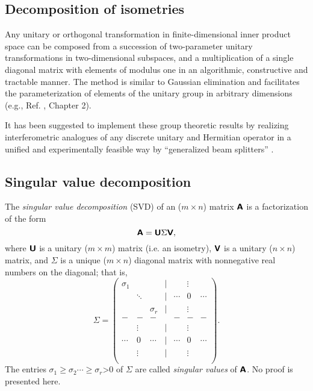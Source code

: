 \subsection{Decomposition of isometries}

Any unitary or orthogonal transformation   in finite-dimensional inner product space
can be composed from a succession of two-parameter unitary transformations in
two-dimensional subspaces,
and a multiplication of a single diagonal matrix with elements of modulus one
in an algorithmic, constructive and tractable manner.
The method is similar to Gaussian elimination and facilitates the parameterization of elements
of the unitary group  in arbitrary dimensions (e.g., Ref. \cite{murnaghan}, Chapter 2).

{\color{Purple}
It has been suggested to implement
these group theoretic results by realizing interferometric analogues
of any discrete unitary and Hermitian operator
in a unified and experimentally feasible way by ``generalized beam splitters''   \cite{rzbb,reck-94}.}


\subsection{Singular value decomposition}

The {\em singular value decomposition}
(SVD)
of an ($m\times n$)  matrix $\textsf{\textbf{A}}$ is a factorization of the form
\begin{equation}
\textsf{\textbf{A}} = \textsf{\textbf{U}} \Sigma \textsf{\textbf{V}} ,
\end{equation}
where
$\textsf{\textbf{U}}$ is a unitary ($m\times m$)  matrix (i.e. an isometry),
$\textsf{\textbf{V}}$ is a unitary ($n\times n$)  matrix,
and
$\Sigma$ is a unique ($m\times n$)   diagonal matrix with nonnegative real numbers on the diagonal;
that is,
\begin{equation}
\Sigma =
\begin{pmatrix}
\sigma_1&&&{|}&&\vdots& \\
  &\ddots &&{|}&\cdots &0&\cdots \\
&&\sigma_r&{|}&&\vdots& \\
-&-&-&&-&-&- \\
&\vdots&&{|}&&\vdots& \\
\cdots &0&\cdots &{|}&\cdots &0&\cdots \\
&\vdots&&{|}&&\vdots& \\
\end{pmatrix}.
\end{equation}
The entries $\sigma_1\ge \sigma_2 \cdots \ge \sigma_r$>0 of $\Sigma$ are called {\em singular values}
of $\textsf{\textbf{A}}$.  No proof is presented here.

